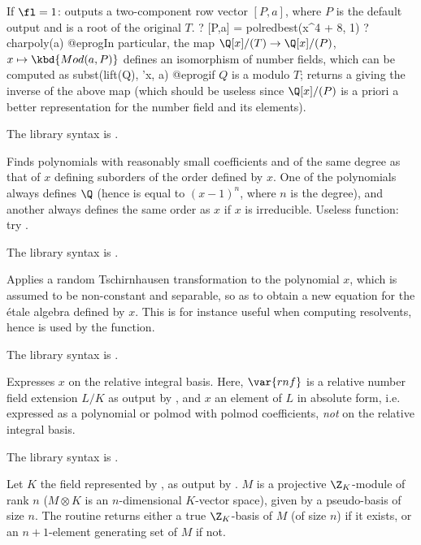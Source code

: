 If $\fl = 1$: outputs a two-component row vector $[P,a]$,  where $P$ is the
default output and  is a root of the original $T$.
\bprog
? [P,a] = polredbest(x^4 + 8, 1)
? charpoly(a)
@eprog\noindent In particular, the map $\Q[x]/(T) \to \Q[x]/(P)$,
$x\mapsto \kbd{Mod(a,P)}$ defines an isomorphism of number fields, which can
be computed as
\bprog
  subst(lift(Q), 'x, a)
@eprog\noindent if $Q$ is a  modulo $T$; 
returns a  giving the inverse of the above map (which should be
useless since $\Q[x]/(P)$ is a priori a better representation for the number
field and its elements).

The library syntax is .

\label{se:polredord}
Finds polynomials with reasonably small
coefficients and of the same degree as that of $x$ defining suborders of the
order defined by $x$. One of the polynomials always defines $\Q$ (hence
is equal to $(x-1)^n$, where $n$ is the degree), and another always defines
the same order as $x$ if $x$ is irreducible. Useless function: try
.

The library syntax is .

\label{se:poltschirnhaus}
Applies a random Tschirnhausen
transformation to the polynomial $x$, which is assumed to be non-constant
and separable, so as to obtain a new equation for the \'etale algebra
defined by $x$. This is for instance useful when computing resolvents,
hence is used by the  function.

The library syntax is .

\label{se:rnfalgtobasis}
Expresses $x$ on the relative
integral basis. Here, $\var{rnf}$ is a relative number field extension $L/K$
as output by , and $x$ an element of $L$ in absolute form, i.e.
expressed as a polynomial or polmod with polmod coefficients, \emph{not} on
the relative integral basis.

The library syntax is .

\label{se:rnfbasis}
Let $K$ the field represented by
, as output by . $M$ is a projective $\Z_K$-module
of rank $n$ ($M\otimes K$ is an $n$-dimensional $K$-vector space), given by a
pseudo-basis of size $n$. The routine returns either a true $\Z_K$-basis of
$M$ (of size $n$) if it exists, or an $n+1$-element generating set of $M$ if
not.

